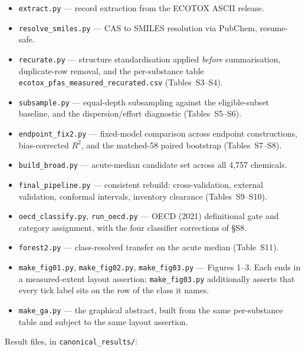 \documentclass[11pt]{article}
\begin{document}
\begin{itemize}\setlength{\itemsep}{0.1em}
\item \texttt{extract.py} --- record extraction from the ECOTOX ASCII release.
\item \texttt{resolve\_smiles.py} --- CAS to SMILES resolution via PubChem, resume-safe.
\item \texttt{recurate.py} --- structure standardisation applied \emph{before}
      summarisation, duplicate-row removal, and the per-substance table
      \texttt{ecotox\_pfas\_\allowbreak measured\_\allowbreak recurated.csv} (Tables~S3--S4).
\item \texttt{subsample.py} --- equal-depth subsampling against the
      eligible-subset baseline, and the dispersion/effort diagnostic
      (Tables~S5--S6).
\item \texttt{endpoint\_fix2.py} --- fixed-model comparison across endpoint
      constructions, bias-corrected $R^2$, and the matched-58 paired bootstrap
      (Tables~S7--S8).
\item \texttt{build\_broad.py} --- acute-median candidate set across all 4{,}757 chemicals.
\item \texttt{final\_pipeline.py} --- consistent rebuild: cross-validation, external
      validation, conformal intervals, inventory clearance (Tables~S9--S10).
\item \texttt{oecd\_classify.py}, \texttt{run\_oecd.py} --- OECD (2021) definitional gate
      and category assignment, with the four classifier corrections of \S S8.
\item \texttt{forest2.py} --- class-resolved transfer on the acute median (Table~S11).
\item \texttt{make\_fig01.py}, \texttt{make\_fig02.py}, \texttt{make\_fig03.py} ---
      Figures 1--3. Each ends in a measured-extent layout assertion;
      \texttt{make\_fig03.py} additionally asserts that every tick label sits on the
      row of the class it names.
\item \texttt{make\_ga.py} --- the graphical abstract, built from the same
      per-substance table and subject to the same layout assertion.
\end{itemize}

Result files, in \texttt{canonical\_results/}:
\end{document}

